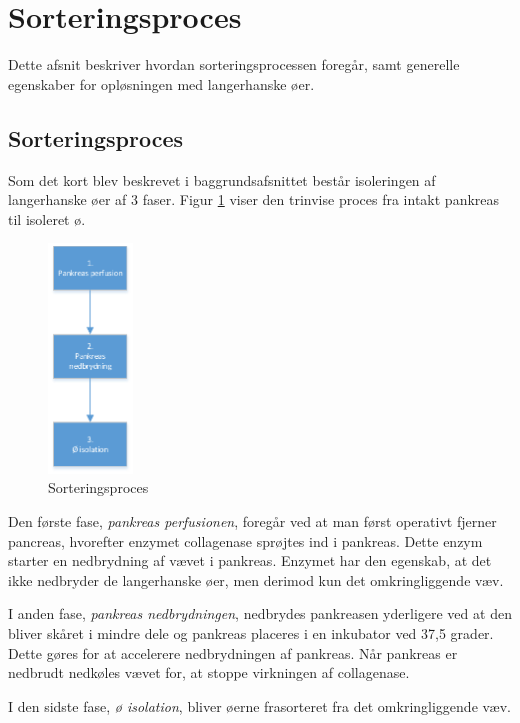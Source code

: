 \section{Sorteringsproces}
Dette afsnit beskriver hvordan sorteringsprocessen foregår, samt generelle egenskaber for opløsningen med langerhanske øer. 

\subsection{Sorteringsproces} \label{subsec:sortproces} 
Som det kort blev beskrevet i baggrundsafsnittet består isoleringen af langerhanske øer af 3 faser. 
Figur \ref{fig:sortproces} viser den trinvise proces fra intakt pankreas til isoleret ø.

\begin{figure}[H]
	\centering
	\includegraphics[width=0.2\textwidth]{billeder/sortering-crop.pdf}
	\caption{Sorteringsproces}
	\label{fig:sortproces}
\end{figure}

Den første fase, \textit{pankreas perfusionen}, foregår ved at man først operativt fjerner pancreas, hvorefter enzymet collagenase sprøjtes ind i pankreas. Dette enzym starter en nedbrydning af vævet i pankreas. Enzymet har den egenskab, at det ikke nedbryder de langerhanske øer, men derimod kun det omkringliggende væv.

I anden fase, \textit{pankreas nedbrydningen}, nedbrydes pankreasen yderligere ved at den bliver skåret i mindre dele og pankreas placeres i en inkubator ved 37,5 grader. Dette gøres for at accelerere nedbrydningen af pankreas. Når pankreas er nedbrudt nedkøles vævet for, at stoppe virkningen af collagenase. 

I den sidste fase, \textit{ø isolation}, bliver øerne frasorteret fra det omkringliggende væv. 


